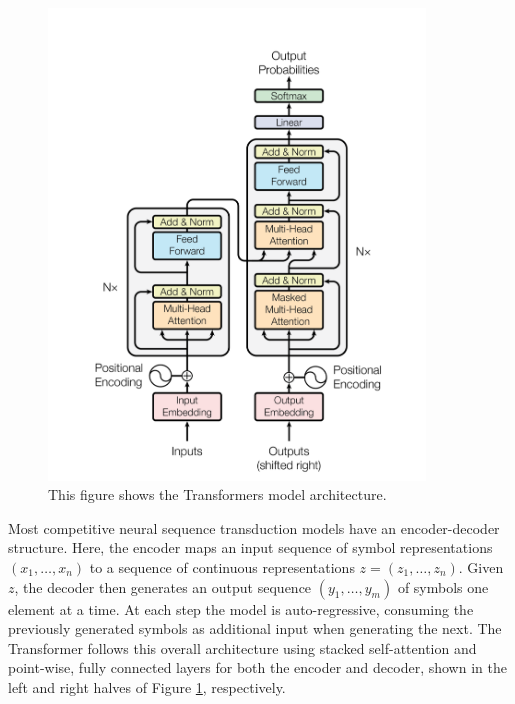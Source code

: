 \begin{figure}[H]
	\centering
	\includegraphics[width=10cm, keepaspectratio]{chapters/1_introduction/imgs/transformers.png}
	\caption{This figure shows the Transformers model architecture.}
	\label{fig:transarch}
\end{figure}

Most competitive neural sequence transduction models have an encoder-decoder structure.
Here, the encoder maps an input sequence of symbol representations $(x_1, \ldots, x_n)$ to a sequence
of continuous representations $z = (z_1, \ldots, z_n)$. Given $z$, the decoder then generates an output
sequence $(y_1, \ldots, y_m)$ of symbols one element at a time. At each step the model is auto-regressive, consuming the previously generated symbols as additional input when generating the next.
The Transformer follows this overall architecture using stacked self-attention and point-wise, fully
connected layers for both the encoder and decoder, shown in the left and right halves of Figure \ref{fig:transarch}, respectively.

